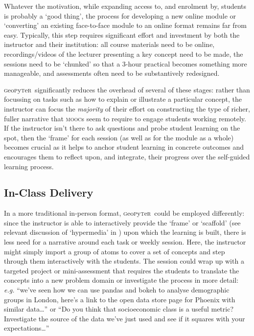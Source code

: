 \documentclass[letter, 11pt,titlepage]{article}
\newcommand{\gp}{\textsc{g}eo\textsc{p}y\textsc{t}e\textsc{r}~\/}
\begin{document}
Whatever the motivation, while expanding access to, and enrolment by, students
is probably a `good thing', the process for developing a new online module or
`converting' an existing face-to-face module to an online format remains far
from easy. Typically, this step requires significant effort and investment by
both the instructor and their institution: all course materials need to be
online, recordings/videos of the lecturer presenting a key concept need to be
made, the sessions need to be `chunked' so that a 3-hour practical becomes
something more manageable, and assessments often need to be substantively
redesigned.

\gp significantly reduces the overhead of several of these stages: rather than
focussing on tasks such as how to explain or illustrate a particular concept,
the instructor can focus the \emph{majority} of their effort on constructing the
type of richer, fuller narrative that \textsc{mooc}s seem to require to engage
students working remotely. If the instructor isn't there to ask questions and
probe student learning on the spot, then the `frame' for each session (as well
as for the module as a whole) becomes crucial as it helps to anchor student
learning in concrete outcomes and encourages them to reflect upon, and
integrate, their progress over the self-guided learning process.

\subsection{In-Class Delivery}\label{in-class-delivery}

In a more traditional in-person format, \gp could be employed differently: since
the instructor is able to interactively provide the `frame' or `scaffold' (see
relevant discussion of `hypermedia' in \citealp{Azevedo2008}) upon which the
learning is built, there is less need for a narrative around each task or weekly
session. Here, the instructor might simply import a group of atoms to cover a
set of concepts and step through them interactively with the students. The
session could wrap up with a targeted project or mini-assessment that requires
the students to translate the concepts into a new problem domain or investigate
the process in more detail: \emph{e.g.} ``we've seen how we can use pandas and
bokeh to analyse demographic groups in London, here's a link to the open data
store page for Phoenix with similar data\ldots{}'' or ``Do you think that
socioeconomic class is a useful metric? Investigate the source of the data we've
just used and see if it squares with your expectations\ldots{}''
\end{document}
